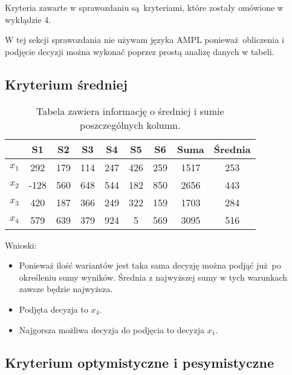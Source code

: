 \documentclass{article}
\begin{document}
Kryteria zawarte w sprawozdaniu są kryteriami, które zostały omówione w wykłądzie 4.

W tej sekcji sprawozdania nie używam języka AMPL ponieważ obliczenia i podjęcie decyzji można wykonać poprzez
prostą analizę danych w tabeli.

\subsection{Kryterium średniej}

\begin{table}[H]
  \begin{center}
    \begin{tabular}{ c |  c  c   c   c   c   c  | c | c  }
      & S1 & S2 & S3 & S4 & S5 & S6 & Suma & Średnia \\
      \hline
      $x_1$ & 292 & 179 & 114 & 247 & 426 & 259 & 1517 & 253 \\
      $x_2$ & -128 & 560 & 648 & 544 & 182 & 850 & 2656 & 443 \\
      $x_3$ & 420 & 187 & 366 & 249 & 322 & 159 & 1703 & 284 \\
      $x_4$ & 579 & 639 & 379 & 924 & 5 & 569 & \cellcolor{orange!25} 3095 & \cellcolor{orange!25} 516 \\
      \hline
    \end{tabular} 
    \caption{\label{table:avg}Tabela zawiera informację o średniej i sumie poszczególnych kolumn.}
  \end{center}
\end{table}

Wnioski:

\begin{itemize}
    \item Ponieważ ilość wariantów jest taka sama decyzję można podjąć już po określeniu sumy wyników. Średnia z najwyższej sumy
      w tych warunkach zawsze będzie najwyższa.
    \item Podjęta decyzja to $x_4$.
    \item Najgorsza możliwa decyzja do podjęcia to decyzja $x_1$.
\end{itemize}

\subsection{Kryterium optymistyczne i pesymistyczne}
\end{document}
